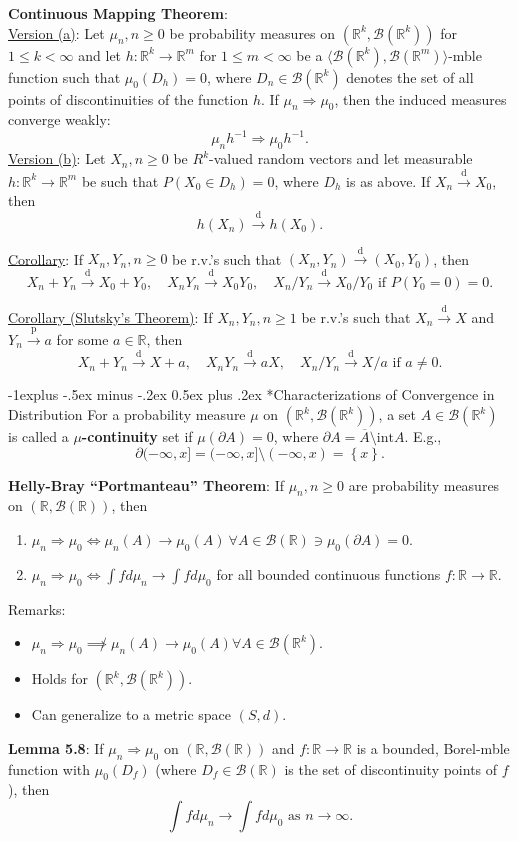 \documentclass[paper=letter,fontsize=3mm]{scrartcl}
\makeatletter
\newcommand{\convdist}{\stackrel{\text{d}}{\longrightarrow}}
\newcommand{\convprob}{\stackrel{\text{p}}{\longrightarrow}}
\newcommand{\Borel}{\mathcal{B}}
\newcommand{\R}{\mathbb{R}}
\newcommand\set[1]{\left\{ #1 \right\}}
\renewcommand{\subsection}{\@startsection{subsection}{2}{0mm}%
                                {-1explus -.5ex minus -.2ex}%
                                {0.5ex plus .2ex}%
                                {\normalfont\normalsize\bfseries}}
\makeatother
\begin{document}
\begin{multicols*}{3}
\textbf{Continuous Mapping Theorem}: \\
\underline{Version (a)}: Let $\mu_n, n \ge0$ be probability measures on $(\R^k, \Borel(\R^k))$ for $1 \le k < \infty$ and let $h: \R^k \to \R^m$ for $1 \le m < \infty$ be a $\langle \Borel(\R^k), \Borel(\R^m) \rangle$-mble function such that $\mu_0(D_h)  = 0$, where $D_n \in \Borel(\R^k)$ denotes the set of all points of discontinuities of the function $h$. If $\mu_n \Rightarrow \mu_0$, then the induced measures converge weakly: $$\mu_n h^{-1} \Rightarrow \mu_0 h^{-1}.$$
\underline{Version (b)}: Let $X_n, n \ge 0$ be $R^k$-valued random vectors and let measurable $h: \R^k \to \R^m$ be such that $P(X_0 \in D_h) = 0$, where $D_h$ is as above. If $X_n \convdist X_0$, then
$$h(X_n) \convdist h(X_0).$$

\underline{Corollary}: If $X_n, Y_n, n \ge 0$ be r.v.'s such that $(X_n, Y_n) \convdist (X_0, Y_0)$, then
$$X_n + Y_n \convdist X_0 + Y_0, \quad X_nY_n \convdist X_0Y_0, \quad X_n/Y_n \convdist X_0/Y_0 \text{ if } P(Y_0 = 0) = 0.$$

\underline{Corollary (Slutsky's Theorem)}: If $X_n, Y_n, n \ge 1$ be r.v.'s such that $X_n \convdist X$ and $Y_n \convprob a$ for some $a \in \R$, then
$$X_n + Y_n \convdist X + a, \quad X_nY_n \convdist aX, \quad X_n/Y_n \convdist X/a \text{ if } a \ne 0.$$

\subsection*{Characterizations of Convergence in Distribution}
For a probability measure $\mu$ on $(\R^k, \Borel(\R^k))$, a set $A \in \Borel(\R^k)$ is called a \textbf{$\mu$-continuity} set if $\mu(\partial A) = 0$, where $\partial A = \overline{A} \setminus \text{int}A$. E.g., $$\partial (-\infty, x] = (-\infty, x] \setminus (-\infty, x) = \set{x}.$$

\textbf{Helly-Bray ``Portmanteau'' Theorem}: If $\mu_n, n\ge0$ are probability measures on $(\R, \Borel(\R))$, then 
\begin{enumerate}
\item $\mu_n \Rightarrow \mu_0 \iff \mu_n(A) \to \mu_0(A) ~\forall A \in \Borel(\R) \ni \mu_0(\partial A) = 0.$
\item $\mu_n \Rightarrow \mu_0 \iff \int fd\mu_n \to \int f d\mu_0$ for all bounded continuous functions $f: \R \to \R$.
\end{enumerate}
Remarks:
\begin{itemize}
\item $\mu_n \Rightarrow \mu_0 \not\implies \mu_n(A) \to \mu_0(A) \forall A \in \Borel(\R^k)$.
\item Holds for $(\R^k, \Borel(\R^k))$.
\item Can generalize to a metric space $(S,d)$.
\end{itemize}
\textbf{Lemma 5.8}: If $\mu_n \Rightarrow \mu_0$ on $(\R, \Borel(\R))$ and $f: \R \to \R$ is a bounded, Borel-mble function with $\mu_0(D_f)$ (where $D_f \in \Borel(\R)$ is the set of discontinuity points of $f$), then $$\int fd\mu_n \to \int f d\mu_0 \text{ as } n \to \infty.$$


\end{multicols*}
\end{document}
